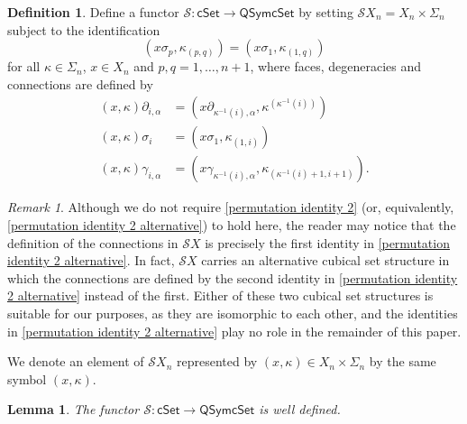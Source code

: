 \documentclass[oneside, 12pt]{amsart}
\numberwithin{equation}{section}
\theoremstyle{plain}
\newtheorem{lemma}[theorem]{Lemma}
\theoremstyle{definition}
\newtheorem{definition}[theorem]{Definition}
\theoremstyle{remark}
\newtheorem{remark}[theorem]{Remark}
\newcommand{\cSet}{\mathsf{cSet}}
\newcommand{\QSymcSet}{\mathsf{QSymcSet}}
\begin{document}
	\begin{definition}
		Define a functor $\mathcal{S}\colon\cSet\to\QSymcSet$ by setting $\mathcal{S}X_n=X_n\times\Sigma_n$ subject to the identification
		\begin{equation}
			\label{identification S}
			(x\sigma_p,\kappa_{(p,q)})=(x\sigma_1,\kappa_{(1,q)})
		\end{equation}
		for all $\kappa\in\Sigma_n$, $x\in X_n$ and $p,q=1,\ldots,n+1$, where faces, degeneracies and connections are defined by
		\begin{align*}
			(x,\kappa)\partial_{i,\alpha}&=(x\partial_{\kappa^{-1}(i),\alpha},\kappa^{(\kappa^{-1}(i))})\\
			(x,\kappa)\sigma_i&=(x\sigma_1,\kappa_{(1,i)})\\
			(x,\kappa)\gamma_{i,\alpha}&=(x\gamma_{\kappa^{-1}(i),\alpha},\kappa_{(\kappa^{-1}(i)+1,i+1)}).
		\end{align*}
	\end{definition}
	\begin{remark}
		Although we do not require \eqref{permutation identity 2} (or, equivalently, \eqref{permutation identity 2 alternative}) to hold here, the reader may notice that the definition of the connections in \(\mathcal{S}X\) is precisely the first identity in \eqref{permutation identity 2 alternative}. In fact, \(\mathcal{S}X\) carries an alternative cubical set structure in which the connections are defined by the second identity in \eqref{permutation identity 2 alternative} instead of the first. Either of these two cubical set structures is suitable for our purposes, as they are isomorphic to each other, and the identities in \eqref{permutation identity 2 alternative} play no role in the remainder of this paper.
	\end{remark}
	
	
	
	
	
	We denote an element of $\mathcal{S}X_n$ represented by $(x,\kappa)\in X_n\times\Sigma_n$ by the same symbol $(x,\kappa)$.
	
	
	
	\begin{lemma}
		The functor $\mathcal{S}\colon\cSet\to\QSymcSet$ is well defined.
	\end{lemma}
	
\end{document}
